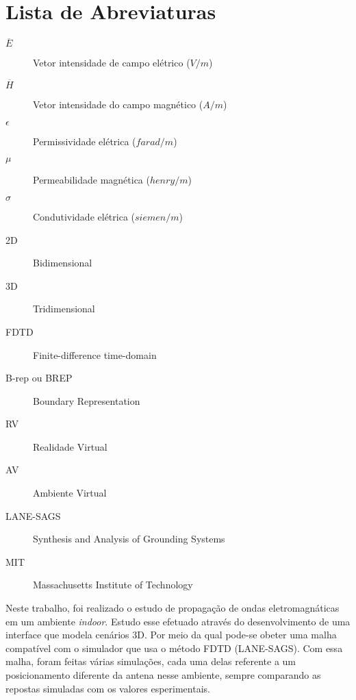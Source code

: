 \documentclass{./public/ufpatccdoisautores}
\begin{document}
\tableofcontents    \clearpage

\listoffigures \clearpage \listoftables \clearpage

\chapter*{Lista de Abreviaturas}

\begin{description}
	\item[$\overline{E}$]	Vetor intensidade de campo elétrico ($V/m$)
	\item[$\overline{H}$]	Vetor intensidade do campo magnético ($A/m$)
	\item[$\epsilon$]	Permissividade elétrica ($farad/m$)
	\item[$\mu$]	Permeabilidade magnética ($henry/m$)
	\item[$\sigma$]	Condutividade elétrica ($siemen/m$)
	\item[2D]	Bidimensional 
	\item[3D]	Tridimensional 
	\item[FDTD]	Finite-difference time-domain 
	\item[B-rep ou BREP]	Boundary Representation 
	\item[RV]	Realidade Virtual 
	\item[AV]	Ambiente Virtual 
	\item[LANE-SAGS]	Synthesis and Analysis of Grounding Systems 
	\item[MIT]	Massachusetts Institute of Technology
\end{description}

\clearpage

\begin{ufpaResumo}
Neste trabalho, foi realizado o estudo de propagação de ondas eletromagnáticas em um ambiente \textit{indoor}. Estudo esse efetuado através do desenvolvimento de uma interface que modela cenários 3D. Por meio da qual pode-se obeter uma malha compatível com o simulador que usa o método FDTD (LANE-SAGS). Com essa malha, foram feitas várias simulações, cada uma delas referente a um posicionamento diferente da antena nesse ambiente, sempre comparando as repostas simuladas com os valores esperimentais.
\end{ufpaResumo}
\end{document}
